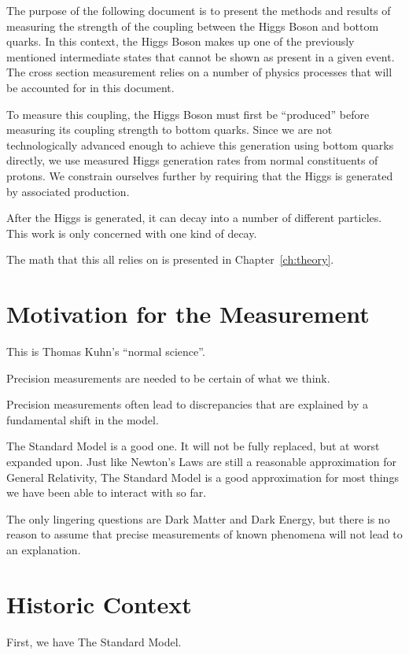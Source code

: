 The purpose of the following document is to present the methods and results of measuring the strength of the coupling between the Higgs Boson and bottom quarks.
In this context, the Higgs Boson makes up one of the previously mentioned intermediate states that cannot be shown as present in a given event.
The cross section measurement relies on a number of physics processes that will be accounted for in this document.

To measure this coupling, the Higgs Boson must first be ``produced'' before measuring its coupling strength to bottom quarks.
Since we are not technologically advanced enough to achieve this generation using bottom quarks directly,
we use measured Higgs generation rates from normal constituents of protons.
We constrain ourselves further by requiring that the Higgs is generated by associated production.

After the Higgs is generated, it can decay into a number of different particles.
This work is only concerned with one kind of decay.

The math that this all relies on is presented in Chapter~\ref{ch:theory}.

\section{Motivation for the Measurement}

This is Thomas Kuhn's ``normal science''.

Precision measurements are needed to be certain of what we think.

Precision measurements often lead to discrepancies that are explained by a fundamental shift in the model.

The Standard Model is a good one.
It will not be fully replaced, but at worst expanded upon.
Just like Newton's Laws are still a reasonable approximation for General Relativity, The Standard Model is a good approximation for most things we have been able to interact with so far.

The only lingering questions are Dark Matter and Dark Energy,
but there is no reason to assume that precise measurements of known phenomena will not lead to an explanation.

\section{Historic Context}

First, we have The Standard Model.

